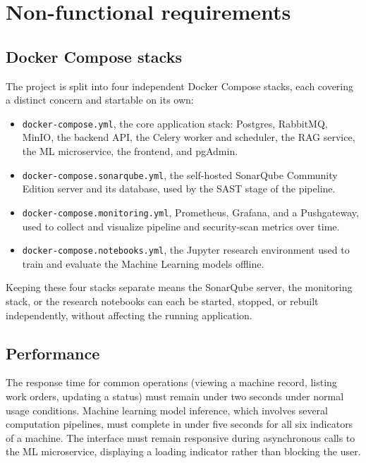 \section{Non-functional requirements}

\subsection{Docker Compose stacks}

The project is split into four independent Docker Compose stacks, each covering a distinct concern and startable on its own:

\begin{itemize}
\item \texttt{docker-compose.yml}, the core application stack: Postgres, RabbitMQ, MinIO, the backend API, the Celery worker and scheduler, the RAG service, the ML microservice, the frontend, and pgAdmin.
\item \texttt{docker-compose.sonarqube.yml}, the self-hosted SonarQube Community Edition server and its database, used by the SAST stage of the pipeline.
\item \texttt{docker-compose.monitoring.yml}, Prometheus, Grafana, and a Pushgateway, used to collect and visualize pipeline and security-scan metrics over time.
\item \texttt{docker-compose.notebooks.yml}, the Jupyter research environment used to train and evaluate the Machine Learning models offline.
\end{itemize}

Keeping these four stacks separate means the SonarQube server, the monitoring stack, or the research notebooks can each be started, stopped, or rebuilt independently, without affecting the running application.

\subsection{Performance}

The response time for common operations (viewing a machine record, listing work orders, updating a status) must remain under two seconds under normal usage conditions.
Machine learning model inference, which involves several computation pipelines, must complete in under five seconds for all six indicators of a machine.
The interface must remain responsive during asynchronous calls to the ML microservice, displaying a loading indicator rather than blocking the user.

